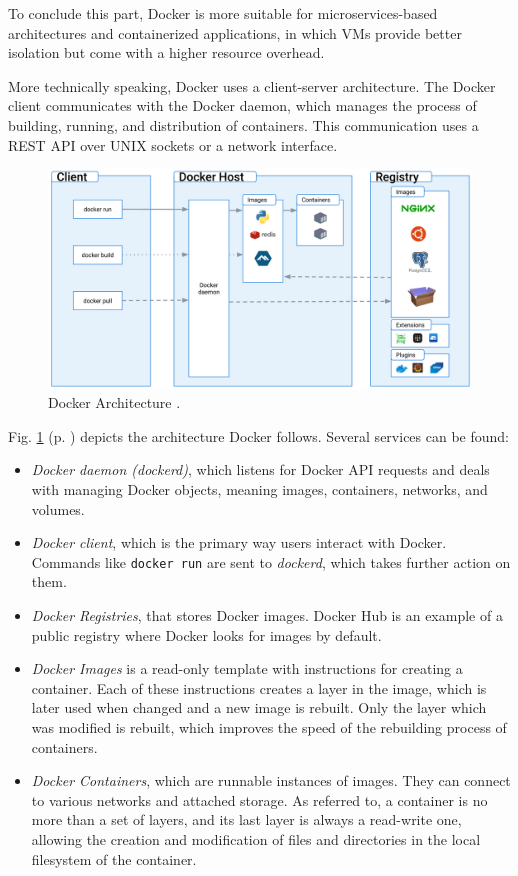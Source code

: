 To conclude this part, Docker is more suitable for microservices-based architectures and containerized applications, in which VMs provide better isolation but come with a higher resource overhead.

More technically speaking, Docker uses a client-server architecture. The Docker client communicates with the Docker daemon, which manages the process of building, running, and distribution of containers. This communication uses a REST API over UNIX sockets or a network interface. 

\begin{figure}[H]
    \includegraphics[width=12cm]{figures/docker_architecture.png}
    \caption{Docker Architecture \cite{docker_architecture_ref}.}
    \label{fig:docker_architecture}
\end{figure}

Fig. \ref{fig:docker_architecture} (p. \pageref{fig:docker_architecture}) depicts the architecture Docker follows. Several services can be found:

\begin{itemize}
    \item \textit{Docker daemon (dockerd)}, which listens for Docker API requests and deals with managing Docker objects, meaning images, containers, networks, and volumes.
    \item \textit{Docker client}, which is the primary way users interact with Docker. Commands like \texttt{docker run} are sent to \textit{dockerd}, which takes further action on them.
    \item \textit{Docker Registries}, that stores Docker images. Docker Hub is an example of a public registry where Docker looks for images by default.
    \item \textit{Docker Images} is a read-only template with instructions for creating a container. Each of these instructions creates a layer in the image, which is later used when changed and a new image is rebuilt. Only the layer which was modified is rebuilt, which improves the speed of the rebuilding process of containers.
    \item \textit{Docker Containers}, which are runnable instances of images. They can connect to various networks and attached storage. As referred to, a container is no more than a set of layers, and its last layer is always a read-write one, allowing the creation and modification of files and directories in the local filesystem of the container.
\end{itemize}

